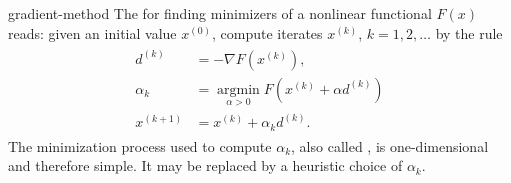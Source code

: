 \begin{Definition}{gradient-method}
  The  for finding minimizers of a nonlinear
  functional $F(x)$ reads:  given an initial value $x^{(0)}$, compute
  iterates $x^{(k)}$, $k=1,2,\ldots$ by the rule
  \begin{gather}
    \label{eq:gradient-method:1}
    \begin{split}
      d^{(k)} &= -\nabla F(x^{(k)}),
      \\
      \alpha_k &=
      \operatorname*{argmin}_{\alpha>0} F\left(x^{(k)} + \alpha d^{(k)}\right)
      \\
      x^{(k+1)} &= x^{(k)} + \alpha_k d^{(k)}.
    \end{split}
  \end{gather}
  The minimization process used to compute $\alpha_k$, also called
  , is one-dimensional
  and therefore simple. It may be replaced by a heuristic choice of
  $\alpha_k$.
\end{Definition}

